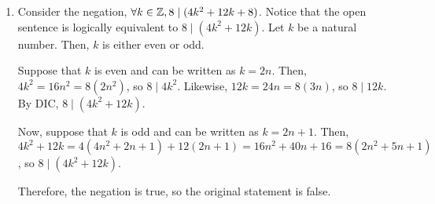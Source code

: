 \begin{enumerate}
  \item \begin{prf}
          Consider the negation, $\forall k\in\mathbb{Z}, 8\mid(4k^2+12k+8)$.
          Notice that the open sentence is logically equivalent to $8 \mid (4k^2+12k)$.
          Let $k$ be a natural number. Then, $k$ is either even or odd.

          Suppose that $k$ is even and can be written as $k=2n$.
          Then, $4k^2=16n^2=8(2n^2)$, so $8 \mid 4k^2$.
          Likewise, $12k=24n=8(3n)$, so $8 \mid 12k$.
          By DIC, $8 \mid (4k^2+12k)$.

          Now, suppose that $k$ is odd and can be written as $k=2n+1$.
          Then, $4k^2+12k = 4(4n^2+2n+1)+12(2n+1) = 16n^2 + 40n + 16 = 8(2n^2+5n+1)$, so $8 \mid (4k^2+12k)$.

          Therefore, the negation is true, so the original statement is false.
        \end{prf}
\end{enumerate}


